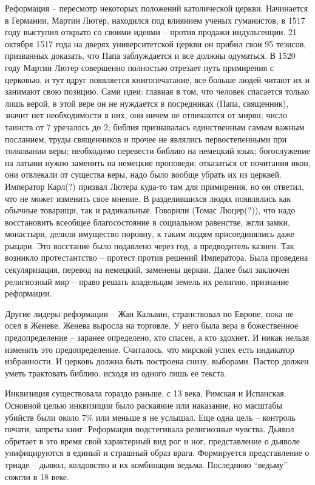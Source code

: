 \documentclass[a4paper, 12pt]{article}
\begin{document}
\begin{multicols}{2}
Реформация -- пересмотр некоторых положений католической церкви. Начинается в Германии, Мартин Лютер, находился под влиянием ученых гуманистов, в 1517 году выступил открыто со своими идеями -- против продажи индульгенции. 21 октября 1517 года на дверях университетской церкви он прибил свои 95 тезисов, призванных доказать, что Папа заблуждается и все должны одуматься. В 1520 году Мартин Лютер совершенно полностью отрезает путь примирения с церковью, и тут вдруг появляется книгопечатание, все больше людей читают их и занимают свою позицию. Сами идеи: главная в том, что человек спасается только лишь верой, в этой вере он не нуждается в посредниках (Папа, священник), значит нет необходимости в них, они ничем не отличаются от мирян; число таинств от 7 урезалось до 2; библия признавалась единственным самым важным посланием, труды священников и прочее не являлись первостепенными при толковании веры; необходимо перевести библию на немецкий язык; богослужение на латыни нужно заменить на немецкие проповеди; отказаться от почитания икон, они отвлекали от существа веры, надо было вообще убрать их из церквей. Император Карл(?) призвал Лютера куда-то там для примирения, но он ответил, что не может изменить свое мнение. В разделившихся людях появлялись как обычные товарищи, так и радикальные. Говорили (Томас Люцер(?)), что надо восстановить всеобщее благосостояние в социальном равенстве, жгли замки, монастыри, делили имущество поровну, к таким людям присоединялись даже рыцари. Это восстание было подавлено через год, а предводитель казнен. Так возникло протестантство -- протест против решений Императора. Была проведена секуляризация, перевод на немецкий, заменены церкви. Далее был заключен религиозный мир -- право решать владельцам земель их религию, признание реформации. 

Другие лидеры реформации -- Жан Кальвин, странствовал по Европе, пока не осел в Женеве. Женева выросла на торговле. У него была вера в божественное предопределение -- заранее определено, кто спасен, а кто здохнет. И никак нельзя изменить это предопределение. Считалось, что мирской успех есть индикатор избранности. И церковь должна быть построена снизу, выборами. Пастор должен уметь трактовать библию, исходя из одного лишь ее текста. 

Инквизиция существовала гораздо раньше, с 13 века, Римская и Испанская. Основной целью инквизиции было раскаяние или наказание, но масштабы убийств были около 7\% или меньше я не услышал. Еще одна цель -- контроль печати, запреты книг. Реформация подстегивала религиозные чувства. Дьявол обретает в это время свой характерный вид рог и ног, представление о дьяволе унифицируются в единый и страшный образ врага. Формируется представление о триаде -- дьявол, колдовство и их комбинация ведьма. Последнюю ``ведьму'' сожгли в 18 веке. 


\end{multicols}
\end{document}
